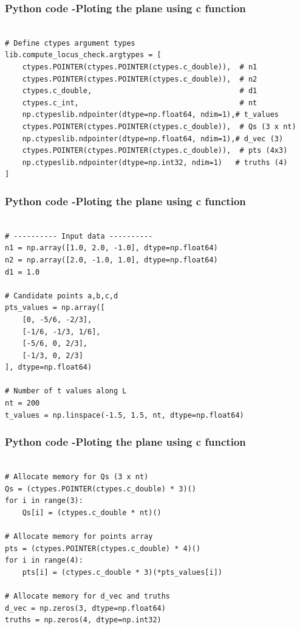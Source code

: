 \documentclass{beamer}
\begin{document}
	
\begin{frame}[fragile]                              
	\frametitle{Python code -Ploting the plane using c function} 
	\begin{lstlisting}

# Define ctypes argument types
lib.compute_locus_check.argtypes = [
    ctypes.POINTER(ctypes.POINTER(ctypes.c_double)),  # n1
    ctypes.POINTER(ctypes.POINTER(ctypes.c_double)),  # n2
    ctypes.c_double,                                  # d1
    ctypes.c_int,                                     # nt
    np.ctypeslib.ndpointer(dtype=np.float64, ndim=1),# t_values
    ctypes.POINTER(ctypes.POINTER(ctypes.c_double)),  # Qs (3 x nt)
    np.ctypeslib.ndpointer(dtype=np.float64, ndim=1),# d_vec (3)
    ctypes.POINTER(ctypes.POINTER(ctypes.c_double)),  # pts (4x3)
    np.ctypeslib.ndpointer(dtype=np.int32, ndim=1)   # truths (4)
]
\end{lstlisting}
\end{frame}

	
\begin{frame}[fragile]                              
	\frametitle{Python code -Ploting the plane using c function} 
	\begin{lstlisting}

# ---------- Input data ----------
n1 = np.array([1.0, 2.0, -1.0], dtype=np.float64)
n2 = np.array([2.0, -1.0, 1.0], dtype=np.float64)
d1 = 1.0

# Candidate points a,b,c,d
pts_values = np.array([
    [0, -5/6, -2/3],
    [-1/6, -1/3, 1/6],
    [-5/6, 0, 2/3],
    [-1/3, 0, 2/3]
], dtype=np.float64)

# Number of t values along L
nt = 200
t_values = np.linspace(-1.5, 1.5, nt, dtype=np.float64)
\end{lstlisting}
\end{frame}

	
\begin{frame}[fragile]                              
	\frametitle{Python code -Ploting the plane using c function} 
	\begin{lstlisting}

# Allocate memory for Qs (3 x nt)
Qs = (ctypes.POINTER(ctypes.c_double) * 3)()
for i in range(3):
    Qs[i] = (ctypes.c_double * nt)()

# Allocate memory for points array
pts = (ctypes.POINTER(ctypes.c_double) * 4)()
for i in range(4):
    pts[i] = (ctypes.c_double * 3)(*pts_values[i])

# Allocate memory for d_vec and truths
d_vec = np.zeros(3, dtype=np.float64)
truths = np.zeros(4, dtype=np.int32)
\end{lstlisting}
\end{frame}
\end{document}
